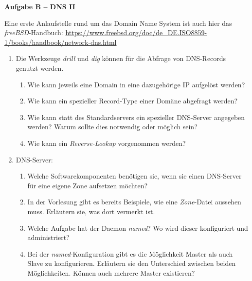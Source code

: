 \documentclass[paper=a4,fontsize=11pt]{scrartcl}%
\numberwithin{equation}{section}
\begin{document}
\begin{center}
\Large{\textbf{Aufgabe B -- DNS II}}
\end{center}
Eine erste Anlaufstelle rund um das Domain Name System ist auch hier das \emph{freeBSD}-Handbuch: \url{https://www.freebsd.org/doc/de_DE.ISO8859-1/books/handbook/network-dns.html}
\begin{enumerate}
	\item Die Werkzeuge \emph{drill} und \emph{dig} können für die Abfrage von DNS-Records genutzt werden.
	\begin{enumerate}
		\item Wie kann jeweils eine Domain in eine dazugehörige IP aufgelöst werden?
		\item Wie kann ein spezieller Record-Type einer Domäne abgefragt werden?
		\item Wie kann statt des Standardservers ein spezieller DNS-Server angegeben werden? Warum sollte dies notwendig oder möglich sein?
		\item Wie kann ein \emph{Reverse-Lookup} vorgenommen werden?
	\end{enumerate}
	\item DNS-Server:
	\begin{enumerate}
		\item Welche Softwarekomponenten benötigen sie, wenn sie einen DNS-Server für eine eigene Zone aufsetzen möchten?
		\item In der Vorlesung gibt es bereits Beispiele, wie eine \emph{Zone}-Datei aussehen muss. Erläutern sie, was dort vermerkt ist.
		\item Welche Aufgabe hat der Daemon \emph{named}? Wo wird dieser konfiguriert und administriert?
		\item Bei der \emph{named}-Konfiguration gibt es die Möglichkeit Master als auch Slave zu konfigurieren. Erläutern sie den Unterschied zwischen beiden Möglichkeiten. Können auch mehrere Master existieren? 
	\end{enumerate}
\end{enumerate}

\printbibliography
\end{document}
